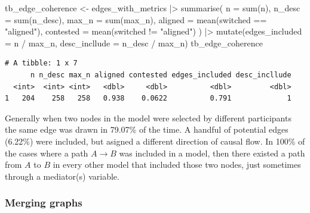 \documentclass[
  letterpaper,
  DIV=11,
  numbers=noendperiod]{scrartcl}
\newenvironment{Shaded}{\begin{snugshade}}{\end{snugshade}}
\newcommand{\AttributeTok}[1]{\textcolor[rgb]{0.40,0.45,0.13}{#1}}
\newcommand{\FunctionTok}[1]{\textcolor[rgb]{0.28,0.35,0.67}{#1}}
\newcommand{\NormalTok}[1]{\textcolor[rgb]{0.00,0.23,0.31}{#1}}
\newcommand{\OtherTok}[1]{\textcolor[rgb]{0.00,0.23,0.31}{#1}}
\newcommand{\SpecialCharTok}[1]{\textcolor[rgb]{0.37,0.37,0.37}{#1}}
\newcommand{\StringTok}[1]{\textcolor[rgb]{0.13,0.47,0.30}{#1}}
\begin{document}
\begin{Shaded}
\begin{Highlighting}[]
\NormalTok{tb\_edge\_coherence }\OtherTok{\textless{}{-}} 
\NormalTok{    edges\_with\_metrics }\SpecialCharTok{|\textgreater{}} 
    \FunctionTok{summarise}\NormalTok{(}
        \AttributeTok{n =} \FunctionTok{sum}\NormalTok{(n),}
        \AttributeTok{n\_desc =} \FunctionTok{sum}\NormalTok{(n\_desc),}
        \AttributeTok{max\_n =} \FunctionTok{sum}\NormalTok{(max\_n),}
        \AttributeTok{aligned =} \FunctionTok{mean}\NormalTok{(switched }\SpecialCharTok{==} \StringTok{"aligned"}\NormalTok{),}
        \AttributeTok{contested =} \FunctionTok{mean}\NormalTok{(switched }\SpecialCharTok{!=} \StringTok{"aligned"}\NormalTok{)}
\NormalTok{    ) }\SpecialCharTok{|\textgreater{}} 
    \FunctionTok{mutate}\NormalTok{(}\AttributeTok{edges\_included =}\NormalTok{ n }\SpecialCharTok{/}\NormalTok{ max\_n,}
           \AttributeTok{desc\_incllude =}\NormalTok{ n\_desc }\SpecialCharTok{/}\NormalTok{ max\_n)}
\NormalTok{tb\_edge\_coherence}
\end{Highlighting}
\end{Shaded}

\begin{verbatim}
# A tibble: 1 x 7
      n n_desc max_n aligned contested edges_included desc_incllude
  <int>  <int> <int>   <dbl>     <dbl>          <dbl>         <dbl>
1   204    258   258   0.938    0.0622          0.791             1
\end{verbatim}

Generally when two nodes in the model were selected by different
participants the same edge was drawn in 79.07\% of the time. A handful
of potential edges (6.22\%) were included, but asigned a different
direction of causal flow. In 100\% of the cases where a path
\(A \rightarrow B\) was included in a model, then there existed a path
from \(A\) to \(B\) in every other model that included those two nodes,
just sometimes through a mediator(s) variable.

\subsubsection{Merging graphs}\label{merging-graphs}
\end{document}

